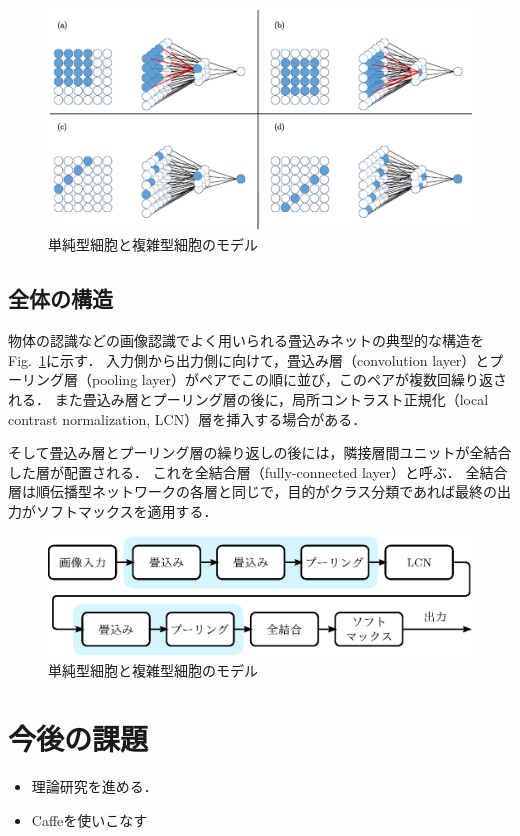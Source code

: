 \documentclass[a4paper,10pt]{jsarticle}
\begin{document}
\begin{figure}[t]
 \centering
 \includegraphics[scale=0.4]{fig/eps/cnn62.eps}
  \caption{単純型細胞と複雑型細胞のモデル}
  \label{fig:単純型細胞と複雑型細胞のモデル}
\end{figure}

\subsection{全体の構造}
物体の認識などの画像認識でよく用いられる畳込みネットの典型的な構造をFig.~\ref{}に示す．
入力側から出力側に向けて，畳込み層（convolution layer）とプーリング層（pooling layer）がペアでこの順に並び，このペアが複数回繰り返される．
また畳込み層とプーリング層の後に，局所コントラスト正規化（local contrast normalization, LCN）層を挿入する場合がある．

そして畳込み層とプーリング層の繰り返しの後には，隣接層間ユニットが全結合した層が配置される．
これを全結合層（fully-connected layer）と呼ぶ．
全結合層は順伝播型ネットワークの各層と同じで，目的がクラス分類であれば最終の出力がソフトマックスを適用する．

\begin{figure}[t]
 \centering
 \includegraphics[scale=0.7]{fig/eps/structure.eps}
  \caption{単純型細胞と複雑型細胞のモデル}
  \label{fig:単純型}
\end{figure}

\section{今後の課題}
\begin{itemize}
 \item 理論研究を進める．
 \item Caffeを使いこなす
\end{itemize}
\end{document}
